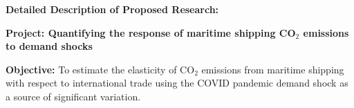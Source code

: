 \documentclass[hidelinks, 12pt,letterpaper]{article}
\begin{document}


    

\begin{center}
\textbf{Detailed Description of Proposed Research: }\vspace{-0.25cm}
\end{center}

\noindent \textbf{Project: Quantifying the response of maritime shipping CO$_2$ emissions to demand shocks} 
\smallskip 

\noindent \textbf{Objective:} To estimate the elasticity of CO$_2$ emissions from maritime shipping with respect to international trade using the COVID pandemic demand shock as a source of significant variation.
\smallskip 
\end{document}
